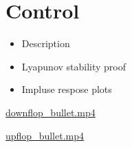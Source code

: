 \documentclass{article}
\begin{document}
\section{Control}
\begin{itemize}
  \item Description
  \item Lyapunov stability proof
  \item Impluse respose plots
\end{itemize}

\href{./downflop_bullet.mp4}{downflop\_bullet.mp4}

\href{./upflop_bullet.mp4}{upflop\_bullet.mp4}
\end{document}
